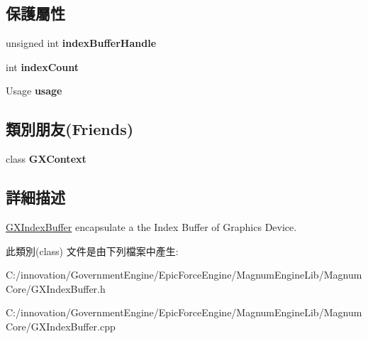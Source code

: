 \subsection*{保護屬性}
\begin{DoxyCompactItemize}
\item 
unsigned int {\bfseries index\+Buffer\+Handle}\hypertarget{class_i_dream_sky_1_1_g_x_index_buffer_a553b2e09a7a8f516bebdcd523ece5504}{}\label{class_i_dream_sky_1_1_g_x_index_buffer_a553b2e09a7a8f516bebdcd523ece5504}

\item 
int {\bfseries index\+Count}\hypertarget{class_i_dream_sky_1_1_g_x_index_buffer_af6923f1835d8f7e4eeca31b21db6e47c}{}\label{class_i_dream_sky_1_1_g_x_index_buffer_af6923f1835d8f7e4eeca31b21db6e47c}

\item 
Usage {\bfseries usage}\hypertarget{class_i_dream_sky_1_1_g_x_index_buffer_a06bc9709098a26e6ed77bfd8c666d9f2}{}\label{class_i_dream_sky_1_1_g_x_index_buffer_a06bc9709098a26e6ed77bfd8c666d9f2}

\end{DoxyCompactItemize}
\subsection*{類別朋友(Friends)}
\begin{DoxyCompactItemize}
\item 
class {\bfseries G\+X\+Context}\hypertarget{class_i_dream_sky_1_1_g_x_index_buffer_a2c36d7f8865080802bbad88cd73d871c}{}\label{class_i_dream_sky_1_1_g_x_index_buffer_a2c36d7f8865080802bbad88cd73d871c}

\end{DoxyCompactItemize}


\subsection{詳細描述}
\hyperlink{class_i_dream_sky_1_1_g_x_index_buffer}{G\+X\+Index\+Buffer} encapsulate a the Index Buffer of Graphics Device. 

此類別(class) 文件是由下列檔案中產生\+:\begin{DoxyCompactItemize}
\item 
C\+:/innovation/\+Government\+Engine/\+Epic\+Force\+Engine/\+Magnum\+Engine\+Lib/\+Magnum\+Core/G\+X\+Index\+Buffer.\+h\item 
C\+:/innovation/\+Government\+Engine/\+Epic\+Force\+Engine/\+Magnum\+Engine\+Lib/\+Magnum\+Core/G\+X\+Index\+Buffer.\+cpp\end{DoxyCompactItemize}
